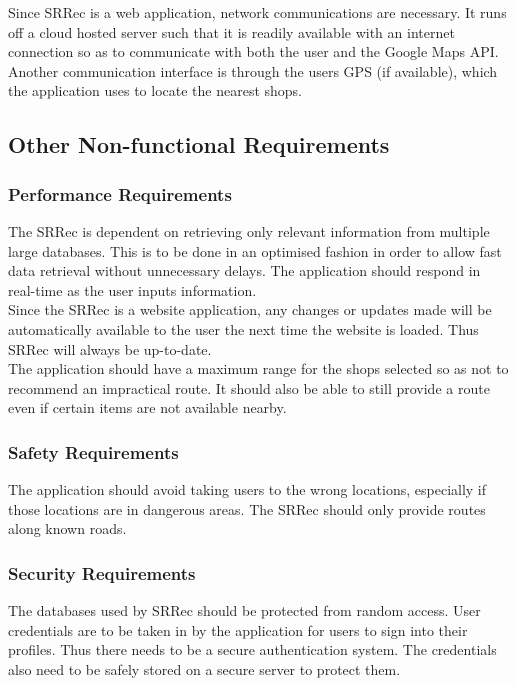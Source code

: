 \documentclass[10pt,twocolumn]{witseiepaper}
\begin{document}
		Since SRRec is a web application, network communications are necessary. It runs off a cloud hosted server such that it is readily available with an internet connection so as to communicate with both the user and the Google Maps API. Another communication interface is through the users GPS (if available), which the application uses to locate the nearest shops.
		
		\subsection{Other Non-functional Requirements}
		
		\subsubsection{Performance Requirements}
		
		The SRRec is dependent on retrieving only relevant information from multiple large databases. This is to be done in an optimised fashion in order to allow fast data retrieval without unnecessary delays. The application should respond in real-time as the user inputs information.\\
		
		Since the SRRec is a website application, any changes or updates made will be automatically available to the user the next time the website is loaded. Thus SRRec will always be up-to-date.\\
		
		The application should have a maximum range for the shops selected so as not to recommend an impractical route. It should also be able to still provide a route even if certain items are not available nearby.
		
		\subsubsection{Safety Requirements}
		
		The application should avoid taking users to the wrong locations, especially if those locations are in dangerous areas. The SRRec should only provide routes along known roads.
		
		\subsubsection{Security Requirements}
		
		The databases used by SRRec should be protected from random access. User credentials are to be taken in by the application for users to sign into their profiles. Thus there needs to be a secure authentication system. The credentials also need to be safely stored on a secure server to protect them.
		
\end{document}
